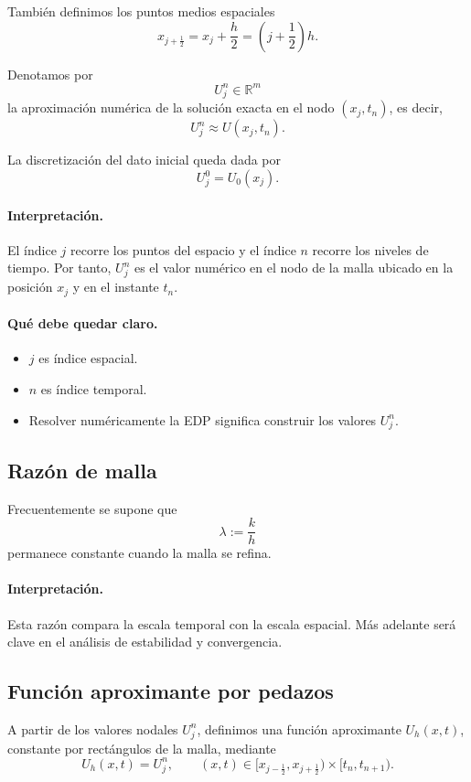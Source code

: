 También definimos los puntos medios espaciales
\[
x_{j+\frac12}=x_j+\frac h2=\left(j+\frac12\right)h.
\]

Denotamos por
\[
U_j^n \in \mathbb{R}^m
\]
la aproximación numérica de la solución exacta en el nodo \((x_j,t_n)\), es decir,
\[
U_j^n \approx U(x_j,t_n).
\]

La discretización del dato inicial queda dada por
\[
U_j^0 = U_0(x_j).
\]

\paragraph{Interpretación.}
El índice \(j\) recorre los puntos del espacio y el índice \(n\) recorre los niveles de tiempo. Por tanto, \(U_j^n\) es el valor numérico en el nodo de la malla ubicado en la posición \(x_j\) y en el instante \(t_n\).

\paragraph{Qué debe quedar claro.}
\begin{itemize}
    \item \(j\) es índice espacial.
    \item \(n\) es índice temporal.
    \item Resolver numéricamente la EDP significa construir los valores \(U_j^n\).
\end{itemize}

\subsection{Razón de malla}

Frecuentemente se supone que
\[
\lambda := \frac{k}{h}
\]
permanece constante cuando la malla se refina.

\paragraph{Interpretación.}
Esta razón compara la escala temporal con la escala espacial. Más adelante será clave en el análisis de estabilidad y convergencia.

\subsection{Función aproximante por pedazos}

A partir de los valores nodales \(U_j^n\), definimos una función aproximante \(U_h(x,t)\), constante por rectángulos de la malla, mediante
\[
U_h(x,t)=U_j^n,
\qquad
(x,t)\in [x_{j-\frac12},x_{j+\frac12})\times [t_n,t_{n+1}).
\]

